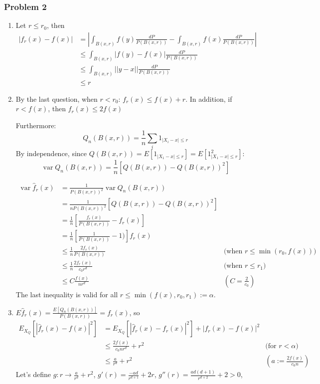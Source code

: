 \documentclass[12pt]{article}
\DeclareMathOperator{\var}{var}
\newcommand{\Q}[1]{\subsubsection*{Problem #1}}
\begin{document}
\Q{2}
\begin{enumerate}
\item
  Let $r \le r_0$, then 
  \begin{align*}
    |f_r(x) - f(x)| &= |\int_{B(x, r)} f(y) \frac{dP}{P(B(x,r))} -  \int_{B(x, r)} f(x) \frac{dP}{P(B(x,r))}|
    \\ & \le \int_{B(x, r)} |f(y) - f(x)| \frac{dP}{P(B(x,r))}
    \\ & \le \int_{B(x, r)} ||y - x|| \frac{dP}{P(B(x,r))}
    \\ & \le r
  \end{align*}
\item

  By the last question, when $r < r_0$: $f_r(x) \le f(x) + r$. In addition, if  $r < f(x)$, then $f_r(x) \le 2 f(x)$

  Furthermore:
  $$Q_n(B(x,r)) = \frac1n \sum_i 1_{|X_i - x| \le r}$$
  By independence, since $ Q(B(x,r)) =  E[1_{|X_1 - x| \le r}] = E[1_{|X_1 - x| \le r}^2]$:
  $$\var Q_n(B(x,r)) = \frac1 n [ Q(B(x,r)) - Q(B(x,r))^2]$$

  \begin{align*}
    \var \hat f_r(x) &= \frac1 {P(B(x,r))^2} \var Q_n(B(x,r)) 
    \\ &= \frac1 {n P(B(x,r))^2} [ Q(B(x,r)) - Q(B(x,r))^2]
    \\ &= \frac1n [\frac{f_r(x)}{P(B(x,r))} - f_r(x)]
    \\ &= \frac1n [\frac1 {P(B(x,r))} - 1)]f_r(x)
    \\ &\le \frac1n \frac{2f_r(x)} {P(B(x,r))} &\text{(when $r \le \min(r_0, f(x))$)}
    \\ &\le \frac1n \frac{2f_r(x)} {c_0 r^d} & \text{(when $r \le r_1)$}
    \\ &\le C\frac{f(x)}{nr^d} & (C = \frac{2}{c_0}) 
  \end{align*}
  The last inequality is valid for all $r \le \min(f(x), r_0, r_1) := \alpha$.

\item
  $E \hat f_r(x) = \frac{E[Q_n(B(x,r))]}{P(B(x,r))} =  f_r(x)$, so
  \begin{align*}
    E_{X_Q}[|\hat f_r(x) - f(x)|^2] &= E_{X_Q}[|\hat f_r(x) - f_r(x)|^2] + |f_r(x) - f(x)|^2
    \\&\le \frac{2f(x)}{c_0 n r^d} + r^2 &\text{(for $r < \alpha$)}
    \\&\le \frac a{r^d} + r^2 &(a :=  \frac{2f(x)}{c_0 n})
  \end{align*}
  Let's define $g: r \rightarrow \frac a {r^d} + r^2$,
  $g'(r) =  \frac{-ad}{r^{d+1}} + 2 r$,
  $g''(r) = \frac{ad(d+1)}{r^{d+2}} + 2 > 0$,


\end{enumerate}
\end{document}
